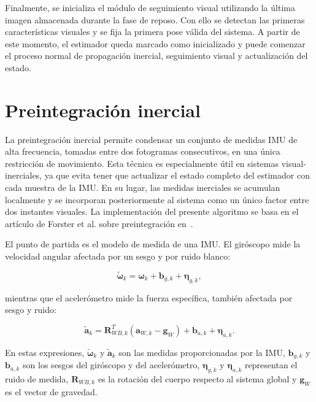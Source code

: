 Finalmente, se inicializa el módulo de seguimiento visual utilizando la última imagen almacenada durante la fase de reposo. Con ello se 
detectan las primeras características visuales y se fija la primera pose válida del sistema. A partir de este momento, el estimador 
queda marcado como inicializado y puede comenzar el proceso normal de propagación inercial, seguimiento visual y actualización del 
estado.

\section{Preintegración inercial}\label{preint}

La preintegración inercial permite condensar un conjunto de medidas IMU de alta frecuencia, tomadas entre dos fotogramas 
consecutivos, en una única restricción de movimiento. Esta técnica es especialmente útil en sistemas visual-inerciales, ya 
que evita tener que actualizar el estado completo del estimador con cada muestra de la IMU. En su lugar, las medidas 
inerciales se acumulan localmente y se incorporan posteriormente al sistema como un único factor entre dos instantes 
visuales. La implementación del presente algoritmo se basa en el artículo de Forster et al. sobre preintegración en~\cite{forster2017preintegration}.

El punto de partida es el modelo de medida de una IMU. El giróscopo mide la velocidad angular afectada por un sesgo y por 
ruido blanco:

\begin{equation}
    \tilde{\boldsymbol{\omega}}_k
    =
    \boldsymbol{\omega}_k
    +
    \mathbf{b}_{g,k}
    +
    \boldsymbol{\eta}_{g,k},
\end{equation}

mientras que el acelerómetro mide la fuerza específica, también afectada por sesgo y ruido:

\begin{equation}
    \tilde{\mathbf{a}}_k
    =
    \mathbf{R}_{WB,k}^{T}
    \left(
        \mathbf{a}_{W,k}
        -
        \mathbf{g}_{W}
    \right)
    +
    \mathbf{b}_{a,k}
    +
    \boldsymbol{\eta}_{a,k}.
\end{equation}

En estas expresiones, $\tilde{\boldsymbol{\omega}}_k$ y $\tilde{\mathbf{a}}_k$ son las medidas proporcionadas por la IMU, $\mathbf{b}_{g,k}$ y $\mathbf{b}_{a,k}$ son los sesgos del giróscopo y del acelerómetro, $\boldsymbol{\eta}_{g,k}$ y $\boldsymbol{\eta}_{a,k}$ representan el ruido de medida, $\mathbf{R}_{WB,k}$ es la rotación del cuerpo respecto al sistema global y $\mathbf{g}_{W}$ es el vector de gravedad.

